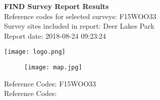 \documentclass{article}\usepackage[]{graphicx}\usepackage[]{color}
\begin{document}
\noindent\begin{minipage}{0.6\textwidth}
\vspace{-10mm}
\LARGE\textbf{FIND Survey Report Results} \\
\normalsize Reference codes for selected surveys: F15WOO33 \\
\normalsize Survey sites included in report: Deer Lakes Park \\
\normalsize Report date: 2018-08-24 09:23:24 \\
\end{minipage}
\hfill
\noindent\begin{minipage}{0.3\textwidth}\raggedleft
\vspace{5mm}
\texttt{[image: logo.png]} \\
\end{minipage}

\begin{figure}[htbp]
\hspace*{-5mm}
\noindent\centering\texttt{[image: map.jpg]}
\end{figure}

\newpage
Reference Codes:  F15WOO33\\Reference Codes:   \\
\end{document}
